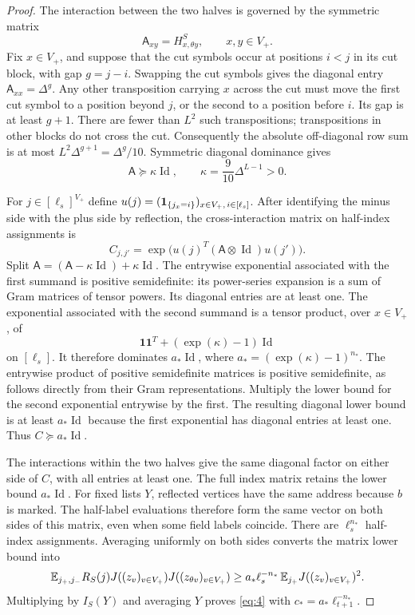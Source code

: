 \begin{proof}
The interaction between the two halves is governed by the symmetric
matrix
\[
 \mathsf A_{xy}=H^S_{x,\theta y},\qquad x,y\in V_+.
\]
Fix $x\in V_+$, and suppose that the cut symbols occur at positions
$i<j$ in its cut block, with gap $g=j-i$.  Swapping the cut symbols
gives the diagonal entry $\mathsf A_{xx}=\Delta^g$.  Any other
transposition carrying $x$ across the cut must move the first cut
symbol to a position beyond $j$, or the second to a position before
$i$.  Its gap is at least $g+1$.  There are fewer than $L^2$ such
transpositions; transpositions in other blocks do not cross the cut.
Consequently the absolute off-diagonal row sum is at most
$L^2\Delta^{g+1}=\Delta^g/10$.  Symmetric diagonal dominance gives
\[
 \mathsf A\succeq\kappa\operatorname{Id},
 \qquad \kappa=\frac9{10}\Delta^{L-1}>0.
\]

For $j\in[\ell_s]^{V_+}$ define
$u(j)=(\mathbf 1_{\{j_x=i\}})_{x\in V_+,\,i\in[\ell_s]}$.
After identifying the minus side with the plus side by reflection,
the cross-interaction matrix on half-index assignments is
\[
 C_{j,j'}=\exp\bigl(u(j)^T
              (\mathsf A\otimes\operatorname{Id})u(j')\bigr).
\]
Split $\mathsf A=(\mathsf A-\kappa\operatorname{Id})+
\kappa\operatorname{Id}$.  The entrywise exponential associated with
the first summand is positive semidefinite: its power-series
expansion is a sum of Gram matrices of tensor powers.  Its diagonal
entries are at least one.  The exponential associated with the second
summand is a tensor product, over $x\in V_+$, of
\[
 \mathbf1\mathbf1^T+(\exp(\kappa)-1)\operatorname{Id}
\]
on $[\ell_s]$.  It therefore dominates
$a_*\operatorname{Id}$, where
$a_*=(\exp(\kappa)-1)^{n_*}$.  The entrywise product of positive
semidefinite matrices is positive semidefinite, as follows directly
from their Gram representations.  Multiply the lower bound for the
second exponential entrywise by the first.  The resulting diagonal
lower bound is at least $a_*\operatorname{Id}$ because the first
exponential has diagonal entries at least one.  Thus
$C\succeq a_*\operatorname{Id}$.

The interactions within the two halves give the same diagonal factor
on either side of $C$, with all entries at least one.  The full index
matrix retains the lower bound $a_*\operatorname{Id}$.  For fixed
lists $Y$, reflected vertices have the same address because $b$ is
marked.  The half-label evaluations therefore form the same vector
on both sides of this matrix, even when some field labels coincide.
There are $\ell_s^{n_*}$ half-index assignments.  Averaging uniformly
on both sides converts the matrix lower bound into
\[
 \mathbb E_{j_+,j_-}R_S(j)
       J((z_v)_{v\in V_+})J((z_{\theta v})_{v\in V_+})
 \ge a_*\ell_s^{-n_*}\,
       \mathbb E_{j_+}J((z_v)_{v\in V_+})^2.
\]
Multiplying by $I_S(Y)$ and averaging $Y$ proves \eqref{eq:4} with
$c_*=a_*\ell_{t+1}^{-n_*}$.
\end{proof}

